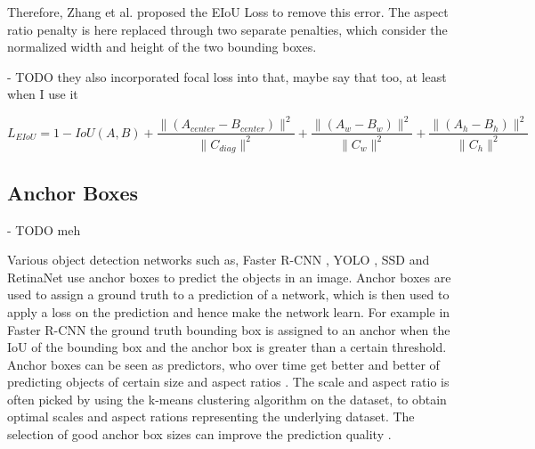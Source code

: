 Therefore, Zhang et al. \cite{eiou} proposed the \ac{EIoU} Loss to remove this error.
The aspect ratio penalty is here replaced through two separate penalties, which consider the normalized width and height of the two bounding boxes.

- TODO they also incorporated focal loss into that, maybe say that too, at least when I use it

\begin{equation}
    L_{EIoU} = 1 - IoU(A, B) + \frac{\|(A_{center} - B_{center})\|^2}{\|C_{diag}\|^2} + \frac{\|(A_{w} - B_{w})\|^2}{\|C_w\|^2} + \frac{\|(A_{h} - B_{h})\|^2}{\|C_h\|^2}
    \label{eq:eiou_loss}
\end{equation}

\subsection{Anchor Boxes}

- TODO meh

Various object detection networks such as, Faster \ac{R-CNN} \cite{faster_rcnn}, \ac{YOLO} \cite{yolov1}, \ac{SSD} \cite{ssd} and RetinaNet \cite{focalloss} use anchor boxes to predict the objects in an image.
Anchor boxes are used to assign a ground truth to a prediction of a network, which is then used to apply a loss on the prediction and hence make the network learn.
For example in Faster \ac{R-CNN} the ground truth bounding box is assigned to an anchor when the \ac{IoU} of the bounding box and the anchor box is greater than a certain threshold.
Anchor boxes can be seen as predictors, who over time get better and better of predicting objects of certain size and aspect ratios \cite{yolov1}.
The scale and aspect ratio is often picked by using the k-means clustering algorithm on the dataset, to obtain optimal scales and aspect rations representing the underlying dataset.
The selection of good anchor box sizes can improve the prediction quality \cite{faster_rcnn}.
